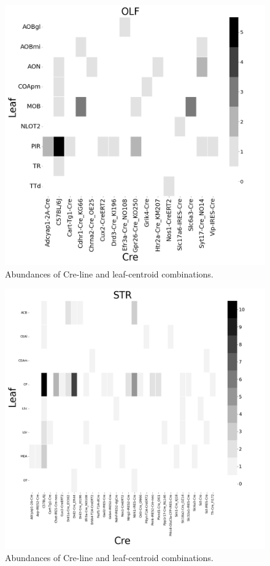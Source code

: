 \begin{figure}[H]
    \centering
    \includegraphics[width = 7in]{figs/OLF centroid density.png} 
     \caption{Abundances of Cre-line and leaf-centroid combinations.}
    \label{fig:my_label}
\end{figure}
\newpage

\begin{figure}[H]
    \centering
    \includegraphics[width = 7in]{figs/STR centroid density.png} 
     \caption{Abundances of Cre-line and leaf-centroid combinations.}
    \label{fig:my_label}
\end{figure}
\newpage

